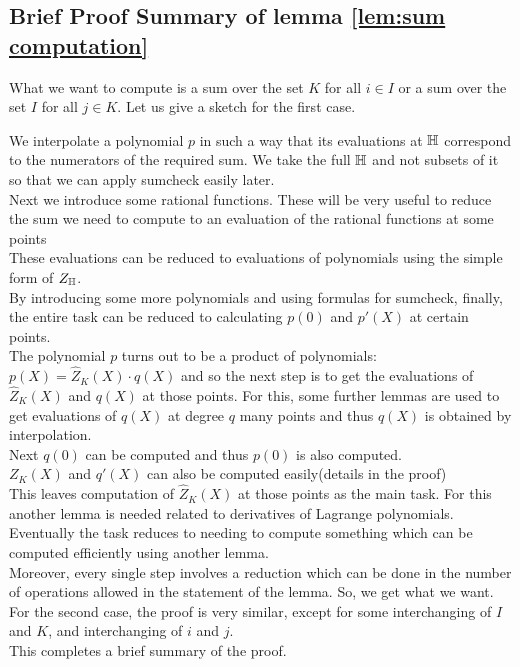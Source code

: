 \subsection{Brief Proof Summary of lemma \ref{lem:sum computation}}
What we want to compute is a sum over the set $K$ for all $i \in I$ or a sum over the set $I$ for all $j \in K$. Let us give a sketch for the first case.

We interpolate a polynomial $p$ in such a way that its evaluations at $\mathbb{H}$ correspond to the numerators of the required sum. We take the full $\mathbb{H}$ and not subsets of it so that we can apply sumcheck easily later. \\
Next we introduce some rational functions. These will be very useful to reduce the sum we need to compute to an evaluation of the rational functions at some points\\


These evaluations can be reduced to evaluations of polynomials using the simple form of $Z_{\mathbb{H}}$. \\

By introducing some more polynomials and using formulas for sumcheck, finally, the entire task can be reduced to calculating $p(0)$ and $p'(X)$ at certain points. \\

The polynomial $p$ turns out to be a product of polynomials: $p(X)=\widehat{Z}_K(X)\cdot q(X)$ and so the next step is to get the evaluations of $\widehat{Z}_K(X)$ and $q(X)$ at those points.
For this, some further lemmas are used to get evaluations of $q(X)$ at degree $q$ many points and thus $q(X)$ is obtained by interpolation. \\
Next $q(0)$ can be computed and thus $p(0)$ is also computed.\\
$Z_K(X)$ and $q'(X)$ can also be computed easily(details in the proof)\\
This leaves computation of $\widehat{Z}_K(X)$ at those points as the main task. For this another lemma is needed related to derivatives of Lagrange polynomials. \\
Eventually the task reduces to needing to compute something which can be computed efficiently using another lemma.\\
Moreover, every single step involves a reduction which can be done in the number of operations allowed in the statement of the lemma. So, we get what we want.\\
For the second case, the proof is very similar, except for some interchanging of $I$ and $K$, and interchanging of $i$ and $j$. \\
This completes a brief summary of the proof.
